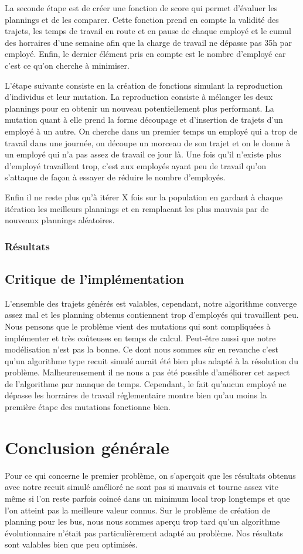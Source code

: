 \documentclass{report}
\begin{document}
La seconde étape est de créer une fonction de score qui permet d'évaluer les plannings et de les comparer. Cette
fonction prend en compte la validité des trajets, les temps de travail en route et en pause de chaque employé et le cumul des horraires
d'une semaine afin que la charge de travail ne dépasse pas 35h par employé. Enfin, le dernier élément pris en compte est
le nombre d'employé car c'est ce qu'on cherche à minimiser.

L'étape suivante consiste en la création de fonctions simulant la reproduction d'individus et leur mutation. La
reproduction consiste à mélanger les deux plannings pour en obtenir un nouveau potentiellement plus performant. La
mutation quant à elle prend la forme découpage et d'insertion de trajets d'un employé à un autre. On cherche dans un
premier temps un employé qui a trop de travail dans une journée, on découpe un morceau de son trajet et on le donne à un
employé qui n'a pas assez de travail ce jour là. Une fois qu'il n'existe plus d'employé travaillent trop, c'est aux
employés ayant peu de travail qu'on s'attaque de façon à essayer de réduire le nombre d'employés.

Enfin il ne reste plus qu'à itérer X fois sur la population en gardant à chaque itération les meilleurs plannings et en
remplacant les plus mauvais par de nouveaux plannings aléatoires.

\subsection{Résultats}

\section{Critique de l'implémentation}

L'ensemble des trajets générés est valables, cependant, notre algorithme converge assez mal et les planning obtenus
contiennent trop d'employés qui travaillent peu. Nous pensons que le problème vient des mutations qui sont compliquées à
implémenter et très coûteuses en temps de calcul. Peut-être aussi que notre modélisation n'est pas la bonne. Ce dont
nous sommes sûr en revanche c'est qu'un algorithme type recuit simulé aurait été bien plus adapté à la résolution du
problème. Malheureusement il ne nous a pas été possible d'améliorer cet aspect
de l'algorithme par manque de temps. Cependant, le fait qu'aucun employé ne dépasse les horraires de travail
réglementaire montre bien qu'au moins la première étape des mutations fonctionne bien.

\chapter{Conclusion générale}
Pour ce qui concerne le premier problème, on s'aperçoit que les résultats obtenus avec notre recuit simulé amélioré ne sont pas si mauvais et tourne assez vite même si l'on reste parfois coincé dans un minimum local trop longtemps et que l'on atteint pas la meilleure valeur connus.
Sur le problème de création de planning pour les bus, nous nous sommes aperçu trop tard qu'un algorithme évolutionnaire
n'était pas particulièrement adapté au problème. Nos résultats sont valables bien que peu optimisés.
\end{document}
